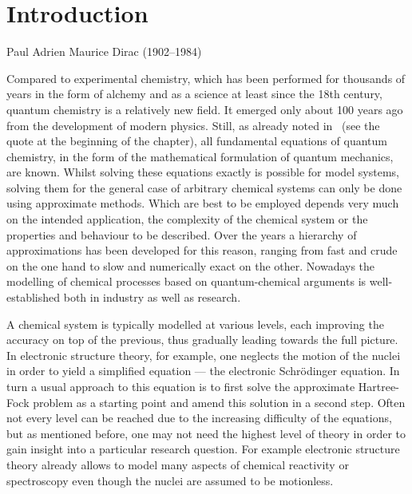 \chapter{Introduction}
{Paul Adrien Maurice Dirac (1902--1984)}

\noindent
Compared to experimental chemistry, which has been
performed for thousands of years in the form of alchemy
and as a science at least since the 18th century,
quantum chemistry is a relatively new field.
It emerged only about 100 years ago from the development of modern physics.
Still, as \citet{Dirac1929} already noted in \citeyear{Dirac1929}%
~(see the quote at the beginning of the chapter),
all fundamental equations of quantum chemistry,
in the form of the mathematical formulation of quantum mechanics, are known.
Whilst solving these equations exactly is possible for model systems,
solving them for the general case of arbitrary
chemical systems can only be done using approximate methods.
Which are best to be employed depends very much on
the intended application,
\ie the complexity of the chemical system
or the properties and behaviour to be described.
Over the years a hierarchy of approximations has been developed
for this reason,
ranging from fast and crude on the one hand to slow and numerically exact on the other.
Nowadays the modelling of chemical processes
based on quantum-chemical arguments
is well-established both in industry as well as research.

A chemical system is typically modelled at various levels,
each improving the accuracy on top of the previous,
thus gradually leading towards the full picture.
In electronic structure theory, for example,
one neglects the motion of the nuclei
in order to yield a simplified equation --- the electronic Schrödinger equation.
In turn a usual approach to this equation is to first
solve the approximate Hartree-Fock problem
as a starting point and amend this solution in a second step.
Often not every level can be reached due to the increasing
difficulty of the equations,
but as mentioned before,
one may not need the highest level of theory in order to gain
insight into a particular research question.
For example electronic structure theory already allows to model
many aspects of chemical reactivity or spectroscopy
even though the nuclei are assumed to be motionless.

